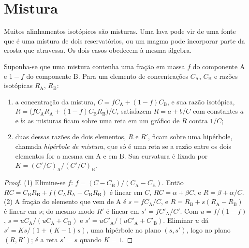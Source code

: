 \section{Mistura}

Muitos alinhamentos isotópicos são misturas. Uma lava pode vir de uma fonte que é uma
mistura de dois reservatórios, ou um magma pode incorporar parte da crosta que atravessa.
Os dois casos obedecem à mesma álgebra.

\begin{proposition}\label{prop:b2:isotope-geochemistry:mixing}
Suponha-se que uma mistura contenha uma fração em massa $f$ do componente A e $1-f$ do componente
B. Para um elemento de concentrações $C_{\mathrm A}$, $C_{\mathrm B}$ e razões
isotópicas $R_{\mathrm A}$, $R_{\mathrm B}$:
\begin{enumerate}
\item a concentração da mistura, $C = fC_{\mathrm A} + (1-f)C_{\mathrm B}$, e
sua razão isotópica,
$R = \bigl(fC_{\mathrm A}R_{\mathrm A} + (1-f)C_{\mathrm B}R_{\mathrm B}\bigr)/C$, satisfazem
$R = a + b/C$ com constantes $a$ e $b$: as misturas ficam sobre uma reta em
um gráfico de $R$ contra $1/C$;
\item duas dessas razões de dois elementos, $R$ e $R'$, ficam sobre uma hipérbole, chamada
\emph{hipérbole de mistura}, que só é uma reta
se a razão entre os dois elementos for a mesma em A e em B. Sua curvatura é fixada por
$K = (C'/C)_{\mathrm A}/(C'/C)_{\mathrm B}$.
\end{enumerate}
\end{proposition}

\begin{proof}
(1) Elimine-se $f$: $f = (C - C_{\mathrm B})/(C_{\mathrm A} - C_{\mathrm B})$. Então
$RC = C_{\mathrm B}R_{\mathrm B} + f(C_{\mathrm A}R_{\mathrm A} - C_{\mathrm B}R_{\mathrm
B})$ é linear em $C$, $RC = \alpha + \beta C$, e $R = \beta + \alpha/C$.
(2) A fração do elemento que vem de A é $s = fC_{\mathrm A}/C$, e $R =
R_{\mathrm B} + s(R_{\mathrm A} - R_{\mathrm B})$ é linear em $s$; do mesmo modo $R'$ é
linear em $s' = fC'_{\mathrm A}/C'$. Com $u = f/(1-f)$, $s = u C_{\mathrm
A}/(uC_{\mathrm A} + C_{\mathrm B})$ e $s' = uC'_{\mathrm A}/(uC'_{\mathrm A} +
C'_{\mathrm B})$. Eliminar $u$ dá $s' = Ks/(1 + (K-1)s)$, uma hipérbole no
plano $(s, s')$, logo no plano $(R, R')$; é a reta $s' = s$
quando $K = 1$.
\end{proof}

